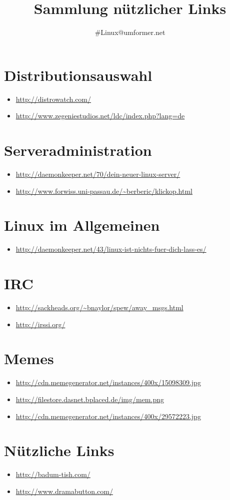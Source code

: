 \documentclass[oneside,12pt,a4paper]{scrartcl}
\title{Sammlung nützlicher Links}
\author{\#Linux@umformer.net}
\newcommand{\linkitem}[1]{\item \url{#1}}
\begin{document}
\maketitle

\tableofcontents
\clearpage

\section{Distributionsauswahl}
\begin{itemize}
\linkitem{http://distrowatch.com/}
\linkitem{http://www.zegeniestudios.net/ldc/index.php?lang=de}
\end{itemize}


\section{Serveradministration}
\begin{itemize}
\linkitem{http://daemonkeeper.net/70/dein-neuer-linux-server/}
\linkitem{http://www.forwiss.uni-passau.de/~berberic/klickop.html}
\end{itemize}

\section{Linux im Allgemeinen}
\begin{itemize}
\linkitem{http://daemonkeeper.net/43/linux-ist-nichts-fuer-dich-lass-es/}
\end{itemize}

\section{IRC}
\begin{itemize}
\linkitem{http://sackheads.org/~bnaylor/spew/away_msgs.html}
\linkitem{http://irssi.org/}
\end{itemize}

\section{Memes}
\begin{itemize}
\linkitem{http://cdn.memegenerator.net/instances/400x/15098309.jpg}
\linkitem{http://filestore.dasnet.bplaced.de/img/mem.png}
\linkitem{http://cdn.memegenerator.net/instances/400x/29572223.jpg}
\end{itemize}

\section{\glqq Nützliche \grqq Links}
\begin{itemize}
\linkitem{http://badum-tish.com/}
\linkitem{http://www.dramabutton.com/}
\end{itemize}
\end{document}
